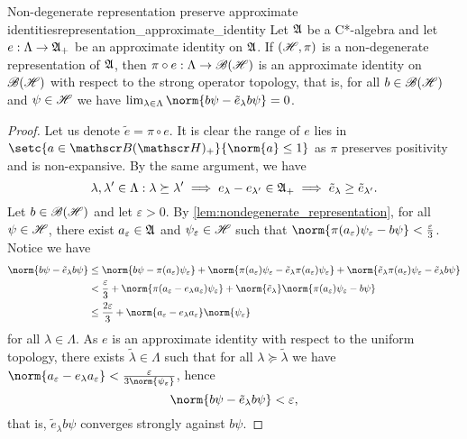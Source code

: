 \begin{proposition}{Non-degenerate representation preserve approximate identities}{representation_approximate_identity}
    Let \(\mathfrak{A}\) be a C*-algebra and let \(e : \Lambda \to \mathfrak{A}_+\) be an approximate identity on \(\mathfrak{A}\). If \((\mathscr{H}, \pi)\) is a non-degenerate representation of \(\mathfrak{A}\), then \(\pi \circ e : \Lambda \to \mathscr{B}(\mathscr{H})\) is an approximate identity on \(\mathscr{B}(\mathscr{H})\) with respect to the strong operator topology, that is, for all \(b \in \mathscr{B}(\mathscr{H})\) and \(\psi \in \mathscr{H}\) we have \(\lim_{\lambda \in \Lambda}{\norm{b\psi - \tilde{e}_{\lambda}b\psi}} = 0\).
\end{proposition}
\begin{proof}
    Let us denote \(\tilde{e} = \pi \circ e\). It is clear the range of \(e\) lies in \(\setc{a \in \bounded(\hilbert)_+}{\norm{a} \leq 1}\) as \(\pi\) preserves positivity and is non-expansive. By the same argument, we have 
    \begin{equation*}
        \lambda, \lambda' \in \Lambda : \lambda \succeq \lambda' \implies e_{\lambda} - e_{\lambda'} \in \mathfrak{A}_+ \implies \tilde{e}_{\lambda} \geq \tilde{e}_{\lambda'}.
    \end{equation*}
    Let \(b \in \mathscr{B}(\mathscr{H})\) and let \(\varepsilon > 0\). By \cref{lem:nondegenerate_representation}, for all \(\psi \in \mathscr{H}\), there exist \(a_{\varepsilon} \in \mathfrak{A}\) and \(\psi_\varepsilon \in \mathscr{H}\) such that \(\norm{\pi(a_{\varepsilon})\psi_{\varepsilon} - b\psi} < \frac\varepsilon3\). Notice we have
    \begin{align*}
        \norm{b \psi - \tilde{e}_{\lambda}b \psi} &\leq \norm{b\psi - \pi(a_\varepsilon)\psi_\varepsilon} + \norm{\pi(a_\varepsilon)\psi_\varepsilon - \tilde{e}_{\lambda}\pi(a_\varepsilon)\psi_\varepsilon} + \norm{\tilde{e}_\lambda\pi(a_\varepsilon)\psi_\varepsilon - \tilde{e}_\lambda b\psi}\\
                                                  &< \frac\varepsilon3 + \norm{\pi(a_\varepsilon - e_\lambda a_\varepsilon)\psi_\varepsilon} + \norm{\tilde{e}_\lambda} \norm{\pi(a_\varepsilon) \psi_\varepsilon - b \psi}\\
                                                  &\leq \frac{2\varepsilon}{3} + \norm{a_\varepsilon - e_\lambda a_\varepsilon} \norm{\psi_\varepsilon}
    \end{align*}
    for all \(\lambda \in \Lambda\). As \(e\) is an approximate identity with respect to the uniform topology, there exists \(\tilde{\lambda} \in \Lambda\) such that for all \(\lambda \succeq \tilde{\lambda}\) we have \(\norm{a_\varepsilon - e_\lambda a_\varepsilon} < \frac{\varepsilon}{3\norm{\psi_\varepsilon}}\), hence
    \begin{equation*}
        \norm{b\psi - \tilde{e}_{\lambda}b\psi} < \varepsilon,
    \end{equation*}
    that is, \(\tilde{e}_\lambda b\psi\) converges strongly against \(b\psi\).
\end{proof}

